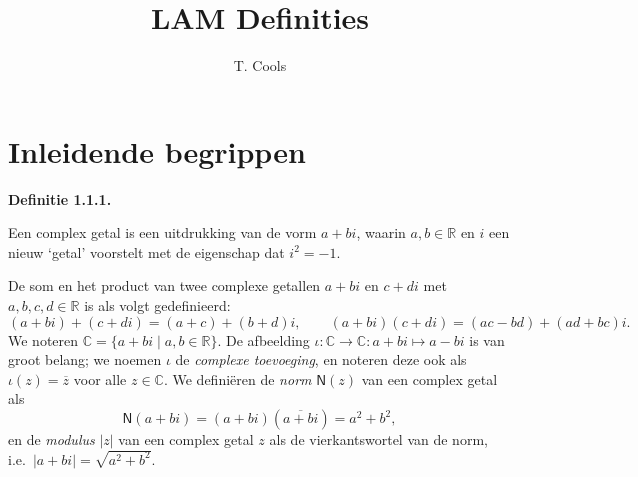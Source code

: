 \documentclass[10pt,a4paper]{article}
\title{\textbf{LAM Definities}}
\author{T. Cools}
\date{}
\newenvironment{res}[1]{%
  \par\noindent\textbf{Definitie #1.}~\ignorespaces
}{%
  \par\vspace{2pt}\normalfont
}
\begin{document}
\maketitle

\section{Inleidende begrippen}

\begin{res}{1.1.1}
Een complex getal is een uitdrukking van de vorm $a+bi$, waarin $a,b\in\mathbb R$ en $i$ een nieuw `getal' voorstelt met de eigenschap dat $i^2=-1$.

De som en het product van twee complexe getallen $a+bi$ en $c+di$ met $a,b,c,d\in\mathbb R$ is als volgt gedefinieerd:
\[
(a+bi)+(c+di)=(a+c)+(b+d)i, \qquad (a+bi)(c+di)=(ac-bd)+(ad+bc)i.
\]
We noteren $\mathbb C=\{a+bi\mid a,b\in\mathbb R\}$. De afbeelding $\iota:\mathbb C\to\mathbb C: a+bi\mapsto a-bi$ is van groot belang; we noemen $\iota$ de \textit{complexe toevoeging}, en noteren deze ook als $\iota(z)=\overline z$ voor alle $z\in\mathbb C$. We defini\"eren de \textit{norm} $\mathsf N(z)$ van een complex getal als
\[
\mathsf N(a+bi)=(a+bi)(\overline{a+bi})=a^2+b^2,
\]
en de \textit{modulus} $|z|$ van een complex getal $z$ als de vierkantswortel van de norm, i.e.\ $|a+bi|=\sqrt{a^2+b^2}$.
\end{res}
\end{document}
